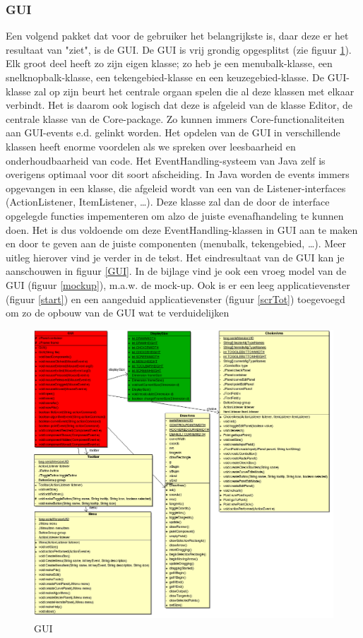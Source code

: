 \documentclass[a4paper,11pt,oneside, titlepage]{article}
\begin{document}
\subsubsection{GUI}
Een volgend pakket dat voor de gebruiker het belangrijkste is, daar deze er het resultaat van "ziet", is de GUI. De GUI is vrij grondig opgesplitst (zie figuur \ref{iGui}). Elk groot deel heeft zo zijn eigen klasse; 
zo heb je een menubalk-klasse, een snelknopbalk-klasse, een tekengebied-klasse en een keuzegebied-klasse. \newline
De GUI-klasse zal op zijn beurt het centrale orgaan spelen die al deze klassen met elkaar verbindt.
Het is daarom ook logisch dat deze is afgeleid van de klasse Editor,
de centrale klasse van de Core-package. Zo kunnen immers Core-functionaliteiten aan GUI-events e.d. gelinkt worden.
\newline
Het opdelen van de GUI in verschillende klassen heeft enorme voordelen als we spreken 
over leesbaarheid en onderhoudbaarheid van code. Het EventHandling-systeem van Java zelf is overigens
optimaal voor dit soort afscheiding. In Java worden de events immers opgevangen in een klasse,
die afgeleid wordt van een van de Listener-interfaces (ActionListener, ItemListener, \ldots). Deze 
klasse zal dan de door de interface opgelegde functies impementeren om alzo de juiste evenafhandeling te kunnen
doen. Het is dus voldoende om deze EventHandling-klassen in GUI aan te maken en door te geven
aan de juiste componenten (menubalk, tekengebied, \ldots). Meer uitleg hierover vind je verder in
de tekst. Het eindresultaat van de GUI kan je aanschouwen in figuur \ref{GUI}.
In de bijlage vind je ook een vroeg model van de GUI (figuur \ref{mockup}), m.a.w. de mock-up.
Ook is er een leeg applicatievenster (figuur \ref{start}) en een aangeduid applicatievenster (figuur \ref{scrTot}) toegevoegd
om zo de opbouw van de GUI wat te verduidelijken
\begin{figure}[htbp]
\centering
\includegraphics[scale=0.4]{./UML2/GUI.png}
\caption{GUI}\label{iGui}
\end{figure}
\end{document}
